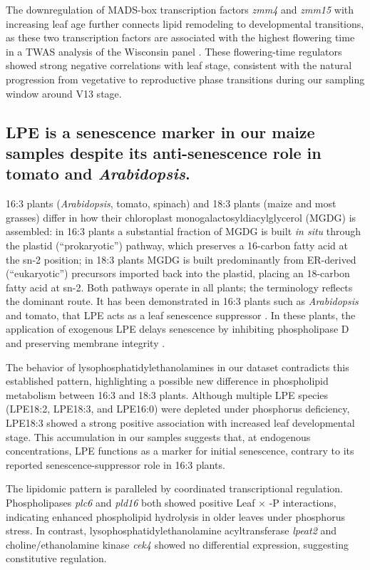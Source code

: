 \documentclass[9pt,twocolumn,twoside]{rilabRxiv}
\begin{document}
The downregulation of MADS-box transcription factors \textit{zmm4} and \textit{zmm15} with increasing leaf age further connects lipid remodeling to developmental transitions, as these two transcription factors are associated with the highest flowering time in a TWAS analysis of the Wisconsin panel \cite{torres-rodriguez2024}.
These flowering-time regulators showed strong negative correlations with leaf stage, consistent with the natural progression from vegetative to reproductive phase transitions during our sampling window around V13 stage.

\subsection*{LPE is a senescence marker in our maize samples despite its anti-senescence role in tomato and \textit{Arabidopsis}.}

16:3 plants (\textit{Arabidopsis}, tomato, spinach) and 18:3 plants (maize and most grasses) differ in how their chloroplast monogalactosyldiacylglycerol (MGDG) is assembled: in 16:3 plants a substantial fraction of MGDG is built \textit{in situ} through the plastid (``prokaryotic'') pathway, which preserves a 16-carbon fatty acid at the sn-2 position; in 18:3 plants MGDG is built predominantly from ER-derived (``eukaryotic'') precursors imported back into the plastid, placing an 18-carbon fatty acid at sn-2.
Both pathways operate in all plants; the terminology reflects the dominant route.
It has been demonstrated in 16:3 plants such as \textit{Arabidopsis} and tomato, that LPE acts as a leaf senescence suppressor \cite{amaro2013}.
 In these plants, the application of exogenous LPE delays senescence by inhibiting phospholipase D and preserving membrane integrity \cite{amaro2013,ryu1997}.
 
The behavior of lysophosphatidylethanolamines in our dataset contradicts this established pattern, highlighting a possible new difference in phospholipid metabolism between 16:3 and 18:3 plants.
Although multiple LPE species (LPE18:2, LPE18:3, and LPE16:0) were depleted under phosphorus deficiency, LPE18:3 showed a strong positive association with increased leaf developmental stage. 
This accumulation in our samples suggests that, at endogenous concentrations, LPE functions as a marker for initial senescence, contrary to its reported senescence-suppressor role in 16:3 plants.

The lipidomic pattern is paralleled by coordinated transcriptional regulation.
Phospholipases \textit{plc6} and \textit{pld16} both showed positive Leaf $\times$ -P interactions, indicating enhanced phospholipid hydrolysis in older leaves under phosphorus stress.
In contrast, lysophosphatidylethanolamine acyltransferase \textit{lpeat2} and choline/ethanolamine kinase \textit{cek4} showed no differential expression, suggesting constitutive regulation.
\end{document}

